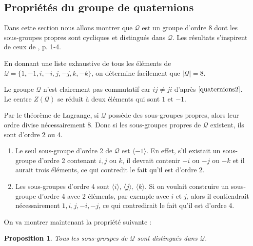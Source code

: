 \documentclass[french]{report}
\newtheorem{prop}{Proposition}[section]
\begin{document}
\subsection{Propriétés du groupe de quaternions}

Dans cette section nous allons montrer que $\mathcal{Q}$ est un groupe d'ordre 8 dont les sous-groupes propres sont cycliques et distingués dans $\mathcal{Q}$. Les résultats s'inspirent de ceux de \cite{wallon}, p. 1-4.

En donnant une liste exhaustive de tous les éléments de $\mathcal{Q} = \{ 1, -1, i, -i,j,-j,k,-k \} $, on détermine facilement que $\mid \mathcal{Q} \mid = 8$.

Le groupe $\mathcal{Q}$ n'est clairement pas commutatif car $ij \neq ji$ d'après $\ref{quaternions2}$. Le centre $Z(\mathcal{Q})$ se réduit à deux éléments qui sont $1$ et $-1$.

Par le théorème de Lagrange, si $\mathcal{Q}$ possède des sous-groupes propres, alors leur ordre divise nécessairement 8. Donc si les sous-groupes propres de $\mathcal{Q}$ existent, ils sont d'ordre 2 ou 4.

\begin{enumerate}
  \item Le seul sous-groupe d'ordre 2 de $\mathcal{Q}$ est $\langle -1 \rangle  $. En effet, s'il existait un sous-groupe d'ordre 2 contenant $i,j$ ou $k$, il devrait contenir $-i$ ou $-j$ ou $-k$ et il aurait trois éléments, ce qui contredit le fait qu'il est d'ordre 2.
  \item Les sous-groupes d'ordre 4 sont $\langle i \rangle $, $\langle j \rangle $, $\langle k \rangle $. Si on voulait construire un sous-groupe d'ordre 4 avec 2 éléments, par exemple avec $i$ et $j$, alors il contiendrait nécessairement $1,i,j,-i,-j$, ce qui contredirait le fait qu'il est d'ordre 4.


\end{enumerate}

On va montrer maintenant la propriété suivante :

\begin{prop}
  Tous les sous-groupes de $\mathcal{Q}$ sont distingués dans $\mathcal{Q}$.
\end{prop}
\end{document}
